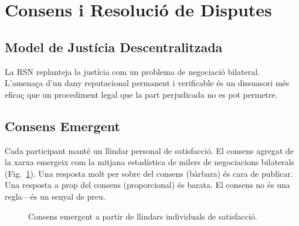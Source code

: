 \documentclass[11pt,a4paper,twocolumn]{article}
\begin{document}
\section{Consens i Resolució de Disputes}

\subsection{Model de Justícia Descentralitzada}

La RSN replanteja la justícia com un problema de negociació bilateral. L'amenaça d'un dany reputacional permanent i verificable és un dissuasori més eficaç que un procediment legal que la part perjudicada no es pot permetre.

\subsection{Consens Emergent}

Cada participant manté un llindar personal de satisfacció. El consens agregat de la xarxa emergeix com la mitjana estadística de milers de negociacions bilaterals (Fig.~\ref{fig:consensus}). Una resposta molt per sobre del consens (bàrbara) és cara de publicar. Una resposta a prop del consens (proporcional) és barata. El consens no és una regla---és un senyal de preu.

\begin{figure}[ht]
\centering
{}
\caption{Consens emergent a partir de llindars individuals de satisfacció.}
\label{fig:consensus}
\end{figure}
\end{document}

